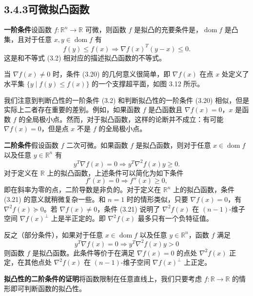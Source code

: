 \documentclass[UTF8, 12pt, fontset=fandol, oneside]{ctexart}
\DeclareMathOperator{\dom}{dom}
\begin{document}
\subsection*{3.4.3\quad 可微拟凸函数}

\noindent\textbf{一阶条件}\quad 设函数 $f:\mathbb{R}^n\to\mathbb{R}$ 可微，则函数 $f$ 是拟凸的充要条件是，$\dom f$ 是凸集，且对于任意 $x,y\in\dom f$ 有
\begin{equation}
f(y)\leq f(x)\Longrightarrow \nabla f(x)^T(y-x)\leq0.
\tag{3.20}
\end{equation}
这是和不等式 (3.2) 相对应的描述拟凸函数的不等式。

当 $\nabla f(x)\neq0$ 时，条件 (3.20) 的几何意义很简单，即 $\nabla f(x)$ 在点 $x$ 处定义了水平集 $\{y\mid f(y)\leq f(x)\}$ 的一个支撑超平面，如图 3.12 所示。

我们注意到判断凸性的一阶条件 (3.2) 和判断拟凸性的一阶条件 (3.20) 相似，但是实际上二者存在重要的差别。例如，如果函数 $f$ 是凸函数且 $\nabla f(x)=0$，$x$ 是函数 $f$ 的全局极小点。然而，对于拟凸函数，这样的论断并不成立：有可能 $\nabla f(x)=0$，但是点 $x$ 不是 $f$ 的全局极小点。

\noindent\textbf{二阶条件}\quad 假设函数 $f$ 二次可微。如果函数 $f$ 是拟凸函数，则对于任意 $x\in\dom f$ 以及任意 $y\in\mathbb{R}^n$ 有
\begin{equation}
y^T\nabla f(x)=0\Longrightarrow y^T\nabla^2f(x)y\geq0.
\tag{3.21}
\end{equation}
对于定义在 $\mathbb{R}$ 上的拟凸函数，上述条件可以简化为如下条件
\[
f'(x)=0\Longrightarrow f''(x)\geq0,
\]
即在斜率为零的点，二阶导数是非负的。对于定义在 $\mathbb{R}^n$ 上的拟凸函数，条件 (3.21) 的意义就稍微复杂一些。和 $n=1$ 时的情形类似，只要 $\nabla f(x)=0$，有 $\nabla^2 f(x)\succeq0$。若 $\nabla f(x)\neq0$，条件 (3.21) 说明了 $\nabla^2f(x)$ 在 $(n-1)$-维子空间 $\nabla f(x)^\perp$ 上是半正定的。即 $\nabla^2f(x)$ 最多只有一个负特征值。

反之（部分条件），如果对于任意 $x\in\dom f$ 以及任意 $y\in\mathbb{R}^n$，函数 $f$ 满足
\begin{equation}
y^T\nabla f(x)=0\Longrightarrow y^T\nabla^2f(x)y>0
\tag{3.22}
\end{equation}
则函数 $f$ 是拟凸函数。此条件等价于在满足 $\nabla f(x)=0$ 的点处 $\nabla^2f(x)$ 正定，在其他点处 $\nabla^2f(x)$ 在 $(n-1)$-维子空间 $\nabla f(x)^\perp$ 上正定。

\noindent\textbf{拟凸性的二阶条件的证明}\quad 将函数限制在任意直线上，我们只要考虑 $f:\mathbb{R}\to\mathbb{R}$ 的情形即可判断函数的拟凸性。
\end{document}
